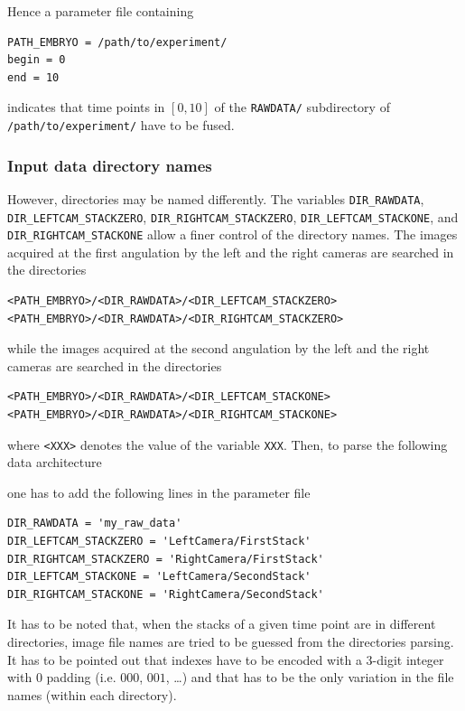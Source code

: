 Hence a parameter file containing
\begin{verbatim}
PATH_EMBRYO = /path/to/experiment/
begin = 0
end = 10
\end{verbatim}
indicates that time points in $[0,10]$ of the \texttt{RAWDATA/}
subdirectory of  \texttt{/path/to/experiment/} have to be fused.

\subsubsection{Input data directory names}

However, directories may be named differently. The variables
\texttt{DIR\_RAWDATA}, \texttt{DIR\_LEFTCAM\_STACKZERO},
\texttt{DIR\_RIGHTCAM\_STACKZERO}, \texttt{DIR\_LEFTCAM\_STACKONE},
and \texttt{DIR\_RIGHTCAM\_STACKONE} allow a finer control of the
directory names. The images acquired at the first angulation by the
left and the right cameras are searched in the directories
\begin{verbatim}
<PATH_EMBRYO>/<DIR_RAWDATA>/<DIR_LEFTCAM_STACKZERO>
<PATH_EMBRYO>/<DIR_RAWDATA>/<DIR_RIGHTCAM_STACKZERO>
\end{verbatim}
while the images acquired at the second angulation by the
left and the right cameras are searched in the directories
\begin{verbatim}
<PATH_EMBRYO>/<DIR_RAWDATA>/<DIR_LEFTCAM_STACKONE>
<PATH_EMBRYO>/<DIR_RAWDATA>/<DIR_RIGHTCAM_STACKONE>
\end{verbatim}
where \texttt{<XXX>} denotes the value of the variable \texttt{XXX}.
Then, to parse the following data architecture

\mbox{}
\mbox{}

one has to add the following lines in the parameter file
\begin{verbatim}
DIR_RAWDATA = 'my_raw_data'
DIR_LEFTCAM_STACKZERO = 'LeftCamera/FirstStack'
DIR_RIGHTCAM_STACKZERO = 'RightCamera/FirstStack'
DIR_LEFTCAM_STACKONE = 'LeftCamera/SecondStack'
DIR_RIGHTCAM_STACKONE = 'RightCamera/SecondStack'
\end{verbatim}

It has to be noted that, when the stacks of a given time point are in
different directories, image file names are tried to be guessed from
the directories parsing. It has to be pointed out that indexes have to
be encoded with a 3-digit integer with 0 padding (i.e. $000$, $001$,
\ldots) and that has to be the only variation in the file names
(within each directory).


